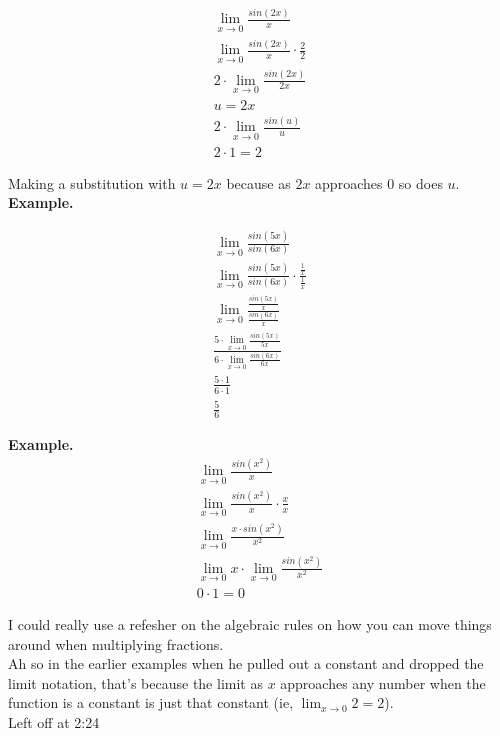 \documentclass{article}
\begin{document}
\begin{align*}
    \lim_{x\to 0} \frac{sin(2x)}{x}\\
    \lim_{x\to 0} \frac{sin(2x)}{x} \cdot \frac{2}{2}\\
    2 \cdot \lim_{x\to 0} \frac{sin(2x)}{2x} \\ 
    u = 2x \\
    2 \cdot \lim_{x\to 0} \frac{sin(u)}{u}\\
    2 \cdot 1 = 2
\end{align*}

Making a substitution with $u = 2x$ because as $2x$ approaches $0$ so does $u$.\\

\textbf{Example.}

\begin{align*}
    \lim_{x\to 0} \frac{sin(5x)}{sin(6x)}\\
    \lim_{x\to 0} \frac{sin(5x)}{sin(6x)} \cdot \frac{\frac{1}{x}}{\frac{1}{x}}\\
    \lim_{x\to 0} \frac{\frac{sin(5x)}{x}}{\frac{sin(6x)}{x}}\\
    \frac{5 \cdot \lim_{x\to 0} \frac{sin(5x)}{5x}}{6 \cdot \lim_{x\to 0}
    \frac{sin(6x)}{6x}}\\
    \frac{5 \cdot 1}{6 \cdot 1}\\
    \frac{5}{6}
\end{align*}


\textbf{Example.}\\

\begin{align*}
    \lim_{x\to 0} \frac{sin(x^2)}{x}\\
    \lim_{x\to 0} \frac{sin(x^2)}{x} \cdot \frac{x}{x}\\
    \lim_{x\to 0} \frac{x \cdot sin(x^2)}{x^2}\\
    \lim_{x\to 0} x \cdot \lim_{x\to 0} \frac{sin(x^2)}{x^2}\\
    0 \cdot 1 = 0
\end{align*}

I could really use a refesher on the algebraic rules on how you can move things around
when multiplying fractions.\\

Ah so in the earlier examples when he pulled out a constant and dropped the limit
notation, that's because the limit as $x$ approaches any number when the function is a
constant is just that constant (ie, $\lim_{x\to 0} 2 = 2$).\\

Left off at 2:24
\end{document}
